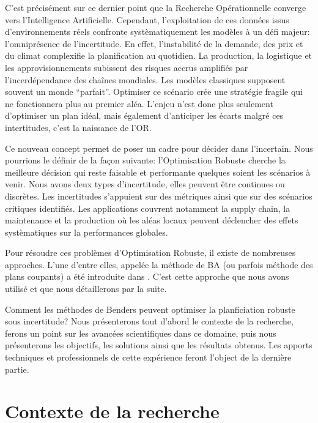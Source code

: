 \documentclass[12pt, a4paper, twoside]{report}
\numberwithin{equation}{section}
\begin{document}
	C'est précisément sur ce dernier point que la Recherche Opérationnelle converge vers l'Intelligence Artificielle. Cependant, l'exploitation de ces données issus d'environnements réels confronte systèmatiquement les modèles à un défi majeur: l'omniprésence de l'incertitude.
	En effet, l'instabilité de la demande, des prix et du climat complexifie la planification au quotidien. La production, la logistique et les approvisionnements subissent des risques accrus amplifiés par l'incerdépendance des chaînes mondiales.
	Les modèles classiques supposent souvent un monde \enquote{parfait}. Optimiser ce scénario crée une stratégie fragile qui ne fonctionnera plus au premier aléa. L'enjeu n'est donc plus seulement d'optimiser un plan idéal, mais également d'anticiper les écarts malgré ces intertitudes, c'est la naissance de l'\ac{OR}.
	
	Ce nouveau concept permet de poser un cadre pour décider dans l'incertain. Nous pourrions le définir de la façon suivante: l'Optimisation Robuste cherche la meilleure décision qui reste faisable et performante quelques soient les scénarios à venir.
	Nous avons deux types d'incertitude, elles peuvent être continues ou discrètes. Les incertitudes s'appuient sur des métriques ainsi que sur des scénarios critiques identifiés.
	Les applications couvrent notamment la supply chain, la maintenance et la production où les aléas locaux peuvent déclencher des effets systèmatiques sur la performances globales.
	
	Pour résoudre ces problèmes d'Optimisation Robuste, il existe de nombreuses approches. L'une d'entre elles, appelée la méthode de \ac{BA} (ou parfois méthode des plans coupants) a été introduite dans \cite{Mutapcic01062009}. C'est cette approche que nous avons utilisé et que nous détaillerons par la suite.
	
	Comment les méthodes de Benders peuvent optimiser la planficiation robuste sous incertitude?
	Nous présenterons tout d'abord le contexte de la recherche, ferons un point sur les avancées scientifiques dans ce domaine, puis nous présenterons les objectifs, les solutions ainsi que les résultats obtenus. Les apports techniques et professionnels de cette expérience feront l'object de la dernière partie.
	
	
	\clearpage
	\section{Contexte de la recherche}
	
\end{document}
